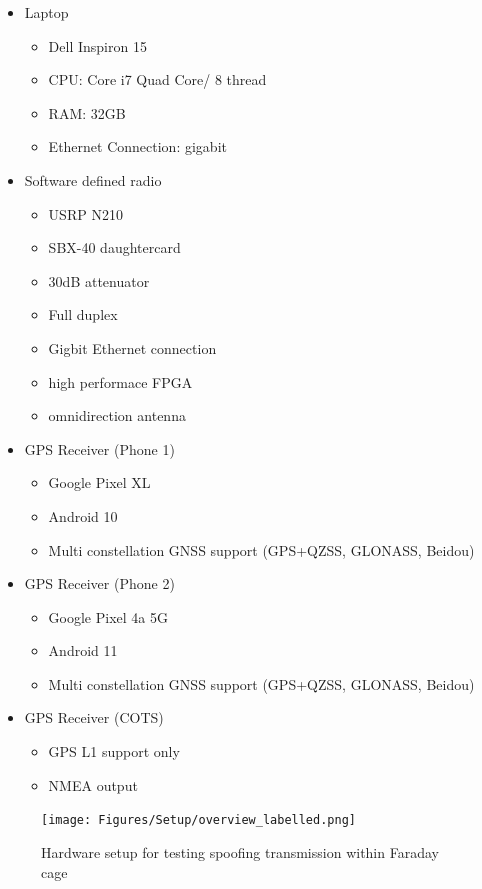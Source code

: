 \begin{itemize}
    \item Laptop
    \begin{itemize}
        \item Dell Inspiron 15
        \item CPU: Core i7 Quad Core/ 8 thread
        \item RAM: 32GB
        \item Ethernet Connection: gigabit
    \end{itemize}
    \item Software defined radio
    \begin{itemize}
        \item USRP N210
        \item SBX-40 daughtercard
        \item 30dB attenuator
        \item Full duplex
        \item Gigbit Ethernet connection
        \item high performace FPGA
        \item omnidirection antenna
    \end{itemize}
    \item GPS Receiver (Phone 1)
    \begin{itemize}
        \item Google Pixel XL
        \item Android 10
        \item Multi constellation GNSS support (GPS+QZSS, GLONASS, Beidou)
    \end{itemize}
    \item GPS Receiver (Phone 2)
    \begin{itemize}
        \item Google Pixel 4a 5G
        \item Android 11
        \item Multi constellation GNSS support (GPS+QZSS, GLONASS, Beidou)
    \end{itemize}
    \item GPS Receiver (COTS)
    \begin{itemize}
        \item GPS L1 support only
        \item NMEA output
    \end{itemize}
\end{itemize}

\begin{figure}[h]
    \begin{centering}
        \texttt{[image: Figures/Setup/overview\_labelled.png]}
        \caption{Hardware setup for testing spoofing transmission within Faraday cage}
    \label{fig:HardwareSetup}
    \end{centering}
\end{figure}


